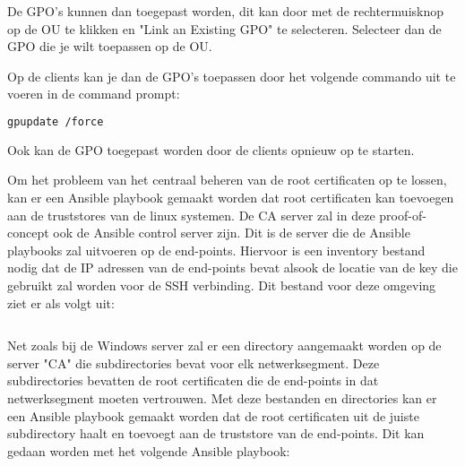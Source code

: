 De GPO's kunnen dan toegepast worden, dit kan door met de rechtermuisknop op de OU te klikken en "Link an Existing GPO" te selecteren. Selecteer dan de GPO die je wilt toepassen op de OU. \n

Op de clients kan je dan de GPO's toepassen door het volgende commando uit te voeren in de command prompt:
\begin{lstlisting}[language=bash]
    gpupdate /force
\end{lstlisting}
Ook kan de GPO toegepast worden door de clients opnieuw op te starten.

\label{sec:Oplossing voor Linux end-points}
\label{sec:Oplossing met Ansible, zonder Vault}
Om het probleem van het centraal beheren van de root certificaten op te lossen, kan er een Ansible playbook gemaakt worden dat root certificaten kan toevoegen aan de truststores van de linux systemen.
De CA server zal in deze proof-of-concept ook de Ansible control server zijn. Dit is de server die de Ansible playbooks zal uitvoeren op de end-points.
Hiervoor is een inventory bestand nodig dat de IP adressen van de end-points bevat alsook de locatie van de key die gebruikt zal worden voor de SSH verbinding. Dit bestand voor deze omgeving ziet er als volgt uit:
\begin{lstlisting}[language=bash]

\end{lstlisting}

Net zoals bij de Windows server zal er een directory aangemaakt worden op de server "CA" die subdirectories bevat voor elk netwerksegment. Deze subdirectories bevatten de root certificaten die de end-points in dat netwerksegment moeten vertrouwen.
Met deze bestanden en directories kan er een Ansible playbook gemaakt worden dat de root certificaten uit de juiste subdirectory haalt en toevoegt aan de truststore van de end-points. Dit kan gedaan worden met het volgende Ansible playbook:
\begin{lstlisting}[language=bash]
\end{lstlisting}

\label{sec:Oplossing met Ansible, met Vault}

